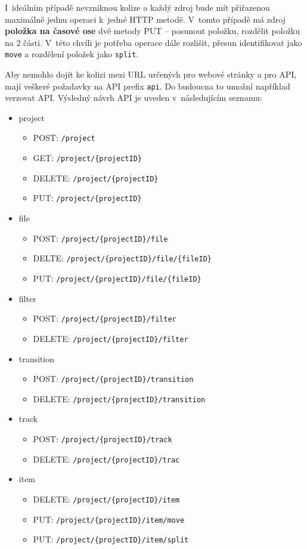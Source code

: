 I~ideálním případě nevzniknou kolize a každý zdroj bude mít přiřazenou maximálně jednu operaci k~jedné HTTP metodě. V~tomto případě má zdroj \textbf{položka na časové ose} dvě metody PUT -- posunout položku, rozdělit položku na 2 části. V~této chvíli je potřeba operace dále rozlišit, přesun identifikovat jako \texttt{move} a rozdělení položek jako \texttt{split}.

Aby nemohlo dojít ke kolizi mezi URL určených pro webové stránky a pro API, mají veškeré požadavky na API prefix \texttt{api}. Do budoucna to umožní například verzovat API. Výsledný návrh API je uveden v~následujícím seznamu:
\begin{itemize}
\item project
\begin{itemize}
\item POST: \texttt{/project}
\item GET: \texttt{/project/\{projectID\}}
\item DELETE: \texttt{/project/\{projectID\}}
\item PUT: \texttt{/project/\{projectID\}}
\end{itemize}
\item file
\begin{itemize}
\item POST: \texttt{/project/\{projectID\}/file}
\item DELTE: \texttt{/project/\{projectID\}/file/\{fileID\}}
\item PUT: \texttt{/project/\{projectID\}/file/\{fileID\}}
\end{itemize}
\item filter
\begin{itemize}
\item POST: \texttt{/project/\{projectID\}/filter}
\item DELETE: \texttt{/project/\{projectID\}/filter}
\end{itemize}
\item transition
\begin{itemize}
\item POST: \texttt{/project/\{projectID\}/transition}
\item DELETE: \texttt{/project/\{projectID\}/transition}
\end{itemize}
\item track
\begin{itemize}
\item POST: \texttt{/project/\{projectID\}/track}
\item DELETE: \texttt{/project/\{projectID\}/trac}
\end{itemize}
\item item
\begin{itemize}
\item DELETE: \texttt{/project/\{projectID\}/item}
\item PUT: \texttt{/project/\{projectID\}/item/move}
\item PUT: \texttt{/project/\{projectID\}/item/split}
\end{itemize}
\end{itemize}

